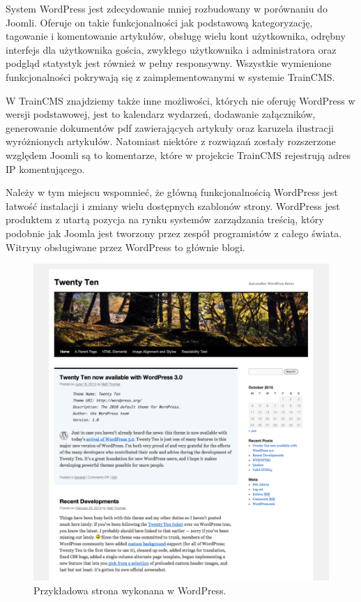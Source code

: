 \documentclass[openright]{xmgr}
\begin{document}
System WordPress jest zdecydowanie mniej rozbudowany w porównaniu do Joomli. Oferuje on takie funkcjonalności jak podstawową kategoryzację, tagowanie i komentowanie artykułów, obsługę wielu kont użytkownika, odrębny interfejs dla użytkownika gościa, zwykłego użytkownika i administratora oraz podgląd statystyk jest również w pełny responsywny. Wszystkie wymienione funkcjonalności pokrywają się z zaimplementowanymi w systemie TrainCMS.

W TrainCMS znajdziemy także inne możliwości, których nie oferuję WordPress w wersji podstawowej, jest to kalendarz wydarzeń, dodawanie załączników, generowanie dokumentów pdf zawierających artykuły oraz karuzela ilustracji wyróżnionych artykułów. Natomiast niektóre z rozwiązań zostały rozszerzone względem Joomli są to komentarze, które w projekcie TrainCMS rejestrują adres IP komentującego. 

Należy w tym miejscu wspomnieć, że główną funkcjonalnością WordPress jest łatwość instalacji i zmiany wielu dostępnych szablonów strony. WordPress jest produktem z utartą pozycja na rynku systemów zarządzania treścią, który podobnie jak Joomla jest tworzony przez zespół programistów z całego świata. Witryny obsługiwane przez WordPress to głównie blogi.

\newpage

\begin{figure}[!tbh]
\centering
\includegraphics[width=\linewidth]{fig/wordpress}
\caption{Przykładowa strona wykonana w WordPress.}
\end{figure}
\end{document}
